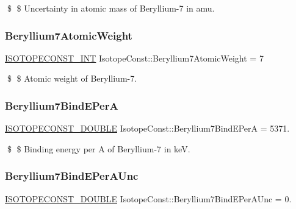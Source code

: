 \$ \$ Uncertainty in atomic mass of Beryllium-\/7 in amu. \mbox{\label{group___isotope_const-_beryllium-_be7_gab90911ef46c8a519dadec32b1e08a65e}} 
\subsubsection{\texorpdfstring{Beryllium7\+Atomic\+Weight}{Beryllium7AtomicWeight}}
{\footnotesize\ttfamily \mbox{\hyperlink{group___isotope_const-_macros_ga5f18360b3e99483a35c32d789e62621c}{I\+S\+O\+T\+O\+P\+E\+C\+O\+N\+S\+T\+\_\+\+I\+NT}} Isotope\+Const\+::\+Beryllium7\+Atomic\+Weight = 7}

\$ \$ Atomic weight of Beryllium-\/7. \mbox{\label{group___isotope_const-_beryllium-_be7_ga024a7de3f654d55a4bf1eedf1639ea26}} 
\subsubsection{\texorpdfstring{Beryllium7\+Bind\+E\+PerA}{Beryllium7BindEPerA}}
{\footnotesize\ttfamily \mbox{\hyperlink{group___isotope_const-_macros_ga8f45a7272ce02c0b4c65c44636ed719a}{I\+S\+O\+T\+O\+P\+E\+C\+O\+N\+S\+T\+\_\+\+D\+O\+U\+B\+LE}} Isotope\+Const\+::\+Beryllium7\+Bind\+E\+PerA = 5371.}

\$ \$ Binding energy per A of Beryllium-\/7 in keV. \mbox{\label{group___isotope_const-_beryllium-_be7_ga6c4d779a1e8420da88a29c1bf6e3cc6e}} 
\subsubsection{\texorpdfstring{Beryllium7\+Bind\+E\+Per\+A\+Unc}{Beryllium7BindEPerAUnc}}
{\footnotesize\ttfamily \mbox{\hyperlink{group___isotope_const-_macros_ga8f45a7272ce02c0b4c65c44636ed719a}{I\+S\+O\+T\+O\+P\+E\+C\+O\+N\+S\+T\+\_\+\+D\+O\+U\+B\+LE}} Isotope\+Const\+::\+Beryllium7\+Bind\+E\+Per\+A\+Unc = 0.}

